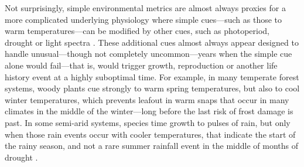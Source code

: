 \documentclass[11pt,letterpaper]{article}
\begin{document}
Not surprisingly, simple environmental metrics are almost always proxies for a more complicated underlying physiology where simple cues---such as those to warm temperatures---can be modified by other cues, such as photoperiod, drought or light spectra \citep{Bagnall1993,Stinchcombe:2004ec}. These additional cues almost always appear designed to handle unusual---though not completely uncommon---years when the simple cue alone would fail---that is, would trigger growth, reproduction or another life history event at a highly suboptimal time. For example, in many temperate forest systems, woody plants cue strongly to warm spring temperatures, but also to cool winter temperatures, which prevents leafout in warm snaps that occur in many climates in the middle of the winter---long before the last risk of frost damage is past. In some semi-arid systems, species time growth to pulses of rain, but only when those rain events occur with cooler temperatures, that indicate the start of the rainy season, and not a rare summer rainfall event in the middle of months of drought \citep{Wainwright:2012tw,wainwright2013}.  %
\end{document}
